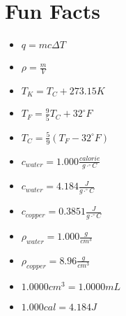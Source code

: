 \documentclass[11pt,addpoints]{exam}   	%
\begin{document}
\section*{Fun Facts}
\begin{multicols}{2}
\begin{itemize}
\item
$q = m c \Delta T$
\vspace{0.2in}

\item
$\rho = \frac{m}{V} $
\vspace{0.2in}

\item
$T_K = T_C + 273.15 K$
\vspace{0.2in}

\item
$T_F = \frac{9}{5}T_C + 32^{\circ}F$
\vspace{0.2in}

\item
$T_C = \frac{5}{9}(T_F - 32^{\circ}F)$
\vspace{0.2in}

\item
$c_{water} = 1.000 \frac{calorie}{g \cdot ^{\circ}C}$
\vspace{0.2in}

\item
$c_{water} = 4.184 \frac{J}{g \cdot ^{\circ}C}$
\vspace{0.2in}

\item
$c_{copper} = 0.3851 \frac{J}{g \cdot ^{\circ}C}$
\vspace{0.2in}

\item
$\rho_{water} = 1.000 \frac{g}{cm^3}$
\vspace{0.2in}

\item
$\rho_{copper} = 8.96 \frac{g}{cm^3}$
\vspace{0.2in}

\item
$ 1.0000 cm^3 = 1.0000 mL $
\vspace{0.2in}

\item
$ 1.000 cal = 4.184 J $
\end{itemize}
\vspace{0.2in}

\end{multicols}
\end{document}
